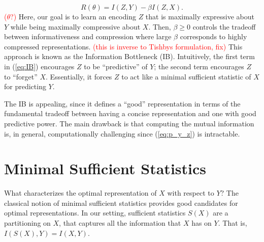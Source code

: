 \documentclass[11pt]{article}
\newcommand\myworries[1]{\textcolor{red}{(#1)}}
\begin{document}
\begin{equation}
R(\theta) = I(Z,Y) - \beta I(Z,X).
\label{eq:IB}
\end{equation}
\myworries{$\theta$?}
Here, our goal is to learn an encoding $Z$ that is maximally expressive about $Y$ while being maximally compressive about $X$. Then, $\beta\geq 0$ controls the tradeoff between informativeness and compression where large $\beta$ corresponds to highly compressed representations. \myworries{this is inverse to Tishbys formulation, fix} This approach is known as the Information Bottleneck (IB). Intuitively, the first term in (\ref{eq:IB}) encourages $Z$ to be ``predictive'' of $Y$; the second term encourages $Z$ to ``forget'' $X$. Essentially, it forces $Z$ to act like a minimal sufficient statistic of $X$ for predicting $Y$.

The IB is appealing, since it defines a ``good'' representation in terms of the fundamental tradeoff between having a concise representation and one with good predictive power. The main drawback is that computing the mutual information is, in general, computationally challenging since (\ref{eq:p_y_z}) is intractable.

\section{Minimal Sufficient Statistics}

What characterizes the optimal representation of $X$ with respect to $Y$? The classical notion of minimal sufficient statistics provides good candidates for optimal representations. In our setting, sufficient statistics $S(X)$ are a partitioning on $X$, that captures all the information that $X$ has on $Y$. That is, $I(S(X), Y) = I(X,Y)$.
\end{document}
